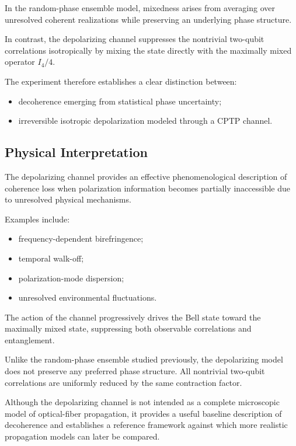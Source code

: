In the random-phase ensemble model, mixedness arises from averaging over unresolved coherent realizations while preserving an underlying phase structure.

In contrast, the depolarizing channel suppresses the nontrivial two-qubit correlations isotropically by mixing the state directly with the maximally mixed operator \(I_4/4\).

The experiment therefore establishes a clear distinction between:

\begin{itemize}
    \item decoherence emerging from statistical phase uncertainty;
    \item irreversible isotropic depolarization modeled through a CPTP channel.
\end{itemize}


\subsection{Physical Interpretation}

The depolarizing channel provides an effective phenomenological description of coherence loss when polarization information becomes partially inaccessible due to unresolved physical mechanisms.

Examples include:

\begin{itemize}
    \item frequency-dependent birefringence;
    \item temporal walk-off;
    \item polarization-mode dispersion;
    \item unresolved environmental fluctuations.
\end{itemize}

The action of the channel progressively drives the Bell state toward the maximally mixed state, suppressing both observable correlations and entanglement.

Unlike the random-phase ensemble studied previously, the depolarizing model does not preserve any preferred phase structure. All nontrivial two-qubit correlations are uniformly reduced by the same contraction factor.

Although the depolarizing channel is not intended as a complete microscopic model of optical-fiber propagation, it provides a useful baseline description of decoherence and establishes a reference framework against which more realistic propagation models can later be compared.